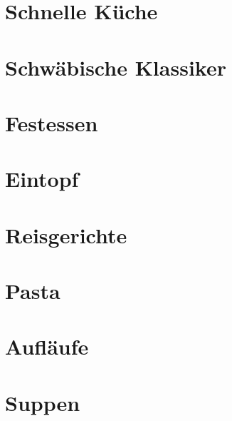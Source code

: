 \documentclass[11pt, DIV=15, twoside=false]{scrbook}
\begin{document}
\newcommand\x{1} %

\tableofcontents

\part{Schnelle Küche}


\part{Schwäbische Klassiker}


\part{Festessen}






\part{Eintopf}


\part{Reisgerichte}




\part{Pasta}





\part{Aufläufe}





\part{Suppen}


\end{document}
